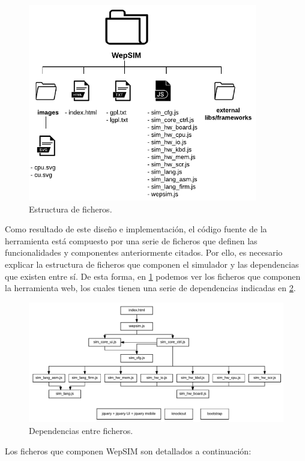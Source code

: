 \begin{figure}[htbp]
 	\centering
 	\includegraphics[width=10cm]{figures/folder_diagram}
 	\caption{Estructura de ficheros.}
	\label{fig:folder_structure}
\end{figure}

Como resultado de este diseño e implementación, el código fuente de la herramienta está compuesto por una serie de ficheros que definen las funcionalidades y componentes anteriormente citados. Por ello, es necesario explicar la estructura de ficheros que componen el simulador y las dependencias que existen entre sí. De esta forma, en \ref{fig:folder_structure} podemos ver los ficheros que componen la herramienta web, los cuales tienen una serie de dependencias indicadas en \ref{fig:files_dependencies}.

\begin{figure}[htbp]
 	\centering
 	\includegraphics[width=15.5cm]{figures/dependencies_diagram}
 	\caption{Dependencias entre ficheros.}
	\label{fig:files_dependencies}
\end{figure}

Los ficheros que componen WepSIM son detallados a continuación:

